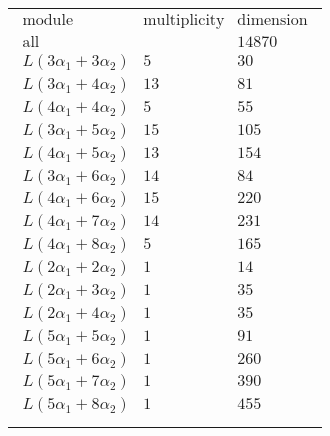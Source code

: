 \documentclass[crop,border=2mm]{standalone}
\begin{document}
\begin{tabular}{l}
$\displaystyle
\begin{array}{rll}
	\text{module}&\text{multiplicity}&\text{dimension} \\ \hline \text{all}&&14870 \\
	L\left( 3\alpha_{1}+ 3\alpha_{2}\right)&5&30\\
	L\left( 3\alpha_{1}+ 4\alpha_{2}\right)&13&81\\
	L\left( 4\alpha_{1}+ 4\alpha_{2}\right)&5&55\\
	L\left( 3\alpha_{1}+ 5\alpha_{2}\right)&15&105\\
	L\left( 4\alpha_{1}+ 5\alpha_{2}\right)&13&154\\
	L\left( 3\alpha_{1}+ 6\alpha_{2}\right)&14&84\\
	L\left( 4\alpha_{1}+ 6\alpha_{2}\right)&15&220\\
	L\left( 4\alpha_{1}+ 7\alpha_{2}\right)&14&231\\
	L\left( 4\alpha_{1}+ 8\alpha_{2}\right)&5&165\\
	L\left( 2\alpha_{1}+ 2\alpha_{2}\right)&1&14\\
	L\left( 2\alpha_{1}+ 3\alpha_{2}\right)&1&35\\
	L\left( 2\alpha_{1}+ 4\alpha_{2}\right)&1&35\\
	L\left( 5\alpha_{1}+ 5\alpha_{2}\right)&1&91\\
	L\left( 5\alpha_{1}+ 6\alpha_{2}\right)&1&260\\
	L\left( 5\alpha_{1}+ 7\alpha_{2}\right)&1&390\\
	L\left( 5\alpha_{1}+ 8\alpha_{2}\right)&1&455
\end{array}
$ \\ \\

\end{tabular}
\end{document}
